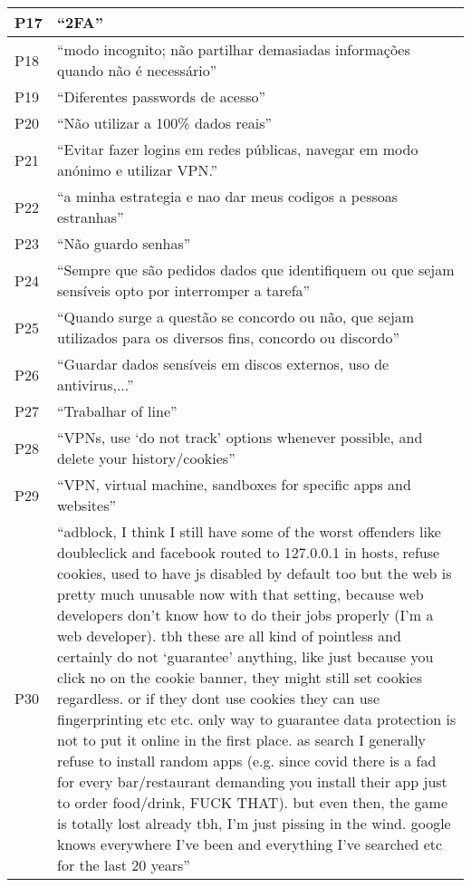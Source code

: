 \begin{longtable}{p{3cm} p{13cm}}
    \hline
    P17 & ``2FA'' \\
    \hline
    P18 & ``modo incognito; não partilhar demasiadas informações quando não é necessário'' \\
    \hline
    P19 & ``Diferentes passwords de acesso'' \\
    \hline
    P20 & ``Não utilizar a 100\% dados reais'' \\
    \hline
    P21 & ``Evitar fazer logins em redes públicas, navegar em modo anónimo e utilizar VPN.'' \\
    \hline
    P22 & ``a minha estrategia e nao dar meus codigos a pessoas estranhas'' \\
    \hline
    P23 & ``Não guardo senhas'' \\
    \hline
    P24 & ``Sempre que são pedidos dados que identifiquem ou que sejam sensíveis opto por interromper a tarefa'' \\
    \hline
    P25 & ``Quando surge a questão se concordo ou não, que sejam utilizados para os diversos fins, concordo ou discordo'' \\
    \hline
    P26 & ``Guardar dados sensíveis em discos externos, uso de antivirus,...'' \\
    \hline
    P27 & ``Trabalhar of line'' \\
    \hline
    P28 & ``VPNs, use `do not track' options whenever possible, and delete your history/cookies'' \\
    \hline
    P29 & ``VPN, virtual machine, sandboxes for specific apps and websites'' \\
    \hline
    P30 & ``adblock, I think I still have some of the worst offenders like doubleclick and facebook routed to 127.0.0.1 in hosts, refuse cookies, used to have js disabled by default too but the web is pretty much unusable now with that setting, because web developers don't know how to do their jobs properly (I'm a web developer).  tbh these are all kind of pointless and certainly do not `guarantee' anything, like just because you click no on the cookie banner, they might still set cookies regardless.  or if they dont use cookies they can use fingerprinting etc etc.  only way to guarantee data protection is not to put it online in the first place.  as search I generally refuse to install random apps (e.g. since covid there is a fad for every bar/restaurant demanding you install their app just to order food/drink, FUCK THAT).  but even then, the game is totally lost already tbh, I'm just pissing in the wind.  google knows everywhere I've been and everything I've searched etc for the last 20 years'' \\

\end{longtable}
